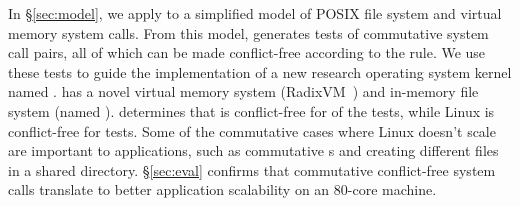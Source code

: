 In \S\ref{sec:model}, we apply \tool to a simplified model of
 POSIX file system and virtual memory system
calls.
%
From this model,
\tool generates  tests of commutative
system call pairs, all of which can be made conflict-free
according to the rule.  We use these tests to
guide the implementation of a new research operating system kernel
named \sys.  \sys has a novel virtual memory system
(RadixVM~\cite{clements:radixvm}) and in-memory file
system (named \fs).  \tool determines that \sys is conflict-free for
 of the
 tests, while Linux is conflict-free
for 
tests.  Some of the commutative cases where Linux doesn't scale are important
to applications, such as commutative
s and creating different files in a shared directory.
\S\ref{sec:eval} confirms that commutative conflict-free system calls
translate to better application scalability on an 80-core machine.



